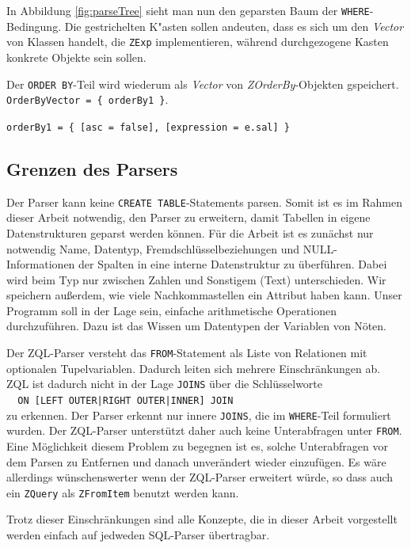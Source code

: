 In Abbildung \ref{fig:parseTree} sieht man nun den geparsten Baum der \verb|WHERE|-Bedingung. Die gestrichelten K"asten sollen andeuten, dass es sich um den \textit{Vector} von Klassen handelt, die \verb|ZExp| implementieren, während durchgezogene Kasten konkrete Objekte sein sollen.

Der \verb|ORDER BY|-Teil wird wiederum als \textit{Vector} von \textit{ZOrderBy}-Objekten gspeichert.\\
\verb|OrderByVector = { orderBy1 }|.

\verb|orderBy1 = { [asc = false], [expression = e.sal] }|

\subsection{Grenzen des Parsers}
\label{subsec:grenzenparser}

Der Parser kann keine \verb|CREATE TABLE|-Statements parsen. Somit ist es im Rahmen dieser Arbeit notwendig, den Parser zu erweitern, damit Tabellen in eigene Datenstrukturen geparst werden können. Für die Arbeit ist es zunächst nur notwendig Name, Datentyp, Fremdschlüsselbeziehungen und NULL-Informationen der Spalten in eine interne Datenstruktur zu überführen. Dabei wird beim Typ nur zwischen Zahlen und Sonstigem (Text) unterschieden. Wir speichern außerdem, wie viele Nachkommastellen ein Attribut haben kann. Unser Programm soll in der Lage sein, einfache arithmetische Operationen durchzuführen. Dazu ist das Wissen um Datentypen der Variablen von Nöten.

Der ZQL-Parser versteht das \verb|FROM|-Statement als Liste von Relationen mit optionalen Tupelvariablen. Dadurch leiten sich mehrere Einschränkungen ab. ZQL ist dadurch nicht in der Lage \verb|JOINS| über die Schlüsselworte \\\verb#  ON [LEFT OUTER|RIGHT OUTER|INNER] JOIN# \\zu erkennen. Der Parser erkennt nur innere \verb|JOINS|, die im \verb|WHERE|-Teil formuliert wurden. Der ZQL-Parser unterstützt daher auch keine Unterabfragen unter \verb|FROM|. Eine Möglichkeit diesem Problem zu begegnen ist es, solche Unterabfragen vor dem Parsen zu Entfernen und danach unverändert wieder einzufügen. Es wäre allerdings wünschenswerter wenn der ZQL-Parser erweitert würde, so dass auch ein \verb|ZQuery| als \verb|ZFromItem| benutzt werden kann.

Trotz dieser Einschränkungen sind alle Konzepte, die in dieser Arbeit vorgestellt werden einfach auf jedweden SQL-Parser übertragbar.


